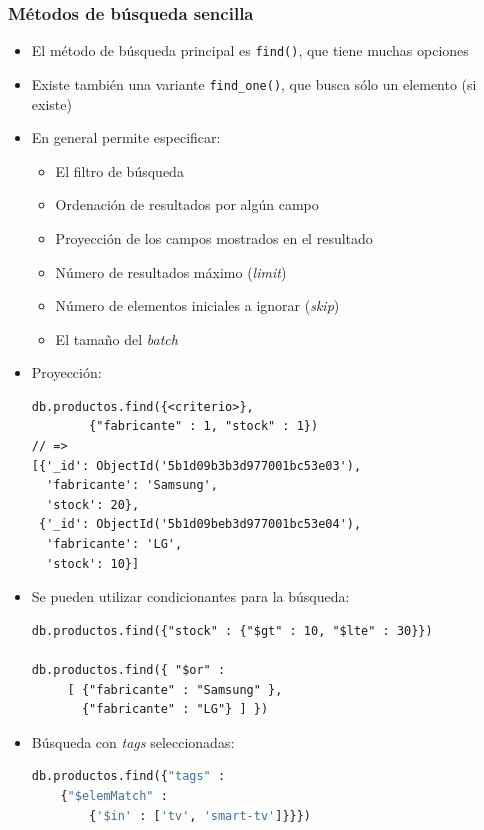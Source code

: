 \documentclass[14pt]{beamer}
\begin{document}
\begin{frame}
  \frametitle{Métodos de búsqueda sencilla}
  \begin{itemize}
  \item El método de búsqueda principal es {\tt find()}, que tiene muchas
    opciones
  \item Existe también una variante {\tt find\_one()}, que busca sólo un
    elemento (si existe)
  \item En general permite especificar:

    \begin{itemize}
    \item El filtro de búsqueda
    \item Ordenación de resultados por algún campo
    \item Proyección de los campos mostrados en el resultado
    \item Número de resultados máximo ({\em limit\/})
    \item Número de elementos iniciales a ignorar ({\em skip\/})
    \item El tamaño del {\em batch}
    \end{itemize}

\framebreak

\item Proyección:
\begin{lstlisting}
db.productos.find({<criterio>},
        {"fabricante" : 1, "stock" : 1})
// =>
[{'_id': ObjectId('5b1d09b3b3d977001bc53e03'),
  'fabricante': 'Samsung',
  'stock': 20},
 {'_id': ObjectId('5b1d09beb3d977001bc53e04'),
  'fabricante': 'LG',
  'stock': 10}]
\end{lstlisting}

  \framebreak

\item Se pueden utilizar condicionantes para la búsqueda:
\begin{lstlisting}
db.productos.find({"stock" : {"$gt" : 10, "$lte" : 30}})

db.productos.find({ "$or" :
     [ {"fabricante" : "Samsung" },
       {"fabricante" : "LG"} ] })
\end{lstlisting}

\item Búsqueda con {\em tags\/} seleccionadas:

\begin{lstlisting}[language=python]
db.productos.find({"tags" :
    {"$elemMatch" :
        {'$in' : ['tv', 'smart-tv']}}})
\end{lstlisting}

  \end{itemize}
\end{frame}
\end{document}
